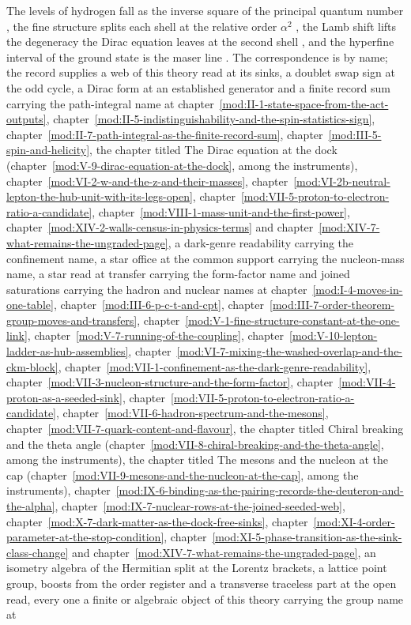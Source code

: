 \begin{chbridge}
The levels of hydrogen fall as the inverse square of the principal quantum number \cite{Bohr1913}, the fine structure splits each shell at the relative order $\alpha^{2}$ \cite{Sommerfeld1916}, the Lamb shift lifts the degeneracy the Dirac equation leaves at the second shell \cite{Lamb1947}, and the hyperfine interval of the ground state is the maser line \cite{Ramsey1990}. The correspondence is by name; the record supplies a web of this theory read at its sinks, a doublet swap sign at the odd cycle, a Dirac form at an established generator and a finite record sum carrying the path-integral name at chapter~\ref{mod:II-1-state-space-from-the-act-outputs}, chapter~\ref{mod:II-5-indistinguishability-and-the-spin-statistics-sign}, chapter~\ref{mod:II-7-path-integral-as-the-finite-record-sum}, chapter~\ref{mod:III-5-spin-and-helicity}, the chapter titled The Dirac equation at the dock (chapter~\ref{mod:V-9-dirac-equation-at-the-dock}, among the instruments), chapter~\ref{mod:VI-2-w-and-the-z-and-their-masses}, chapter~\ref{mod:VI-2b-neutral-lepton-the-hub-unit-with-its-legs-open}, chapter~\ref{mod:VII-5-proton-to-electron-ratio-a-candidate}, chapter~\ref{mod:VIII-1-mass-unit-and-the-first-power}, chapter~\ref{mod:XIV-2-walls-census-in-physics-terms} and chapter~\ref{mod:XIV-7-what-remains-the-ungraded-page}, a dark-genre readability carrying the confinement name, a star office at the common support carrying the nucleon-mass name, a star read at transfer carrying the form-factor name and joined saturations carrying the hadron and nuclear names at chapter~\ref{mod:I-4-moves-in-one-table}, chapter~\ref{mod:III-6-p-c-t-and-cpt}, chapter~\ref{mod:III-7-order-theorem-group-moves-and-transfers}, chapter~\ref{mod:V-1-fine-structure-constant-at-the-one-link}, chapter~\ref{mod:V-7-running-of-the-coupling}, chapter~\ref{mod:V-10-lepton-ladder-as-hub-assemblies}, chapter~\ref{mod:VI-7-mixing-the-washed-overlap-and-the-ckm-block}, chapter~\ref{mod:VII-1-confinement-as-the-dark-genre-readability}, chapter~\ref{mod:VII-3-nucleon-structure-and-the-form-factor}, chapter~\ref{mod:VII-4-proton-as-a-seeded-sink}, chapter~\ref{mod:VII-5-proton-to-electron-ratio-a-candidate}, chapter~\ref{mod:VII-6-hadron-spectrum-and-the-mesons}, chapter~\ref{mod:VII-7-quark-content-and-flavour}, the chapter titled Chiral breaking and the theta angle (chapter~\ref{mod:VII-8-chiral-breaking-and-the-theta-angle}, among the instruments), the chapter titled The mesons and the nucleon at the cap (chapter~\ref{mod:VII-9-mesons-and-the-nucleon-at-the-cap}, among the instruments), chapter~\ref{mod:IX-6-binding-as-the-pairing-records-the-deuteron-and-the-alpha}, chapter~\ref{mod:IX-7-nuclear-rows-at-the-joined-seeded-web}, chapter~\ref{mod:X-7-dark-matter-as-the-dock-free-sinks}, chapter~\ref{mod:XI-4-order-parameter-at-the-stop-condition}, chapter~\ref{mod:XI-5-phase-transition-as-the-sink-class-change} and chapter~\ref{mod:XIV-7-what-remains-the-ungraded-page}, an isometry algebra of the Hermitian split at the Lorentz brackets, a lattice point group, boosts from the order register and a transverse traceless part at the open read, every one a finite or algebraic object of this theory carrying the group name at 
\end{chbridge}
